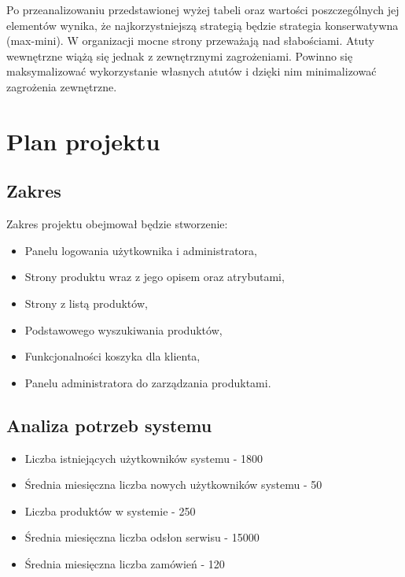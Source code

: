 \documentclass[12pt,a4paper,titlepage]{article}
\begin{document}
Po przeanalizowaniu przedstawionej wyżej tabeli oraz wartości poszczególnych jej elementów wynika, że najkorzystniejszą strategią będzie strategia konserwatywna (max-mini). W organizacji mocne strony przeważają nad słabościami. Atuty wewnętrzne wiążą się jednak z zewnętrznymi zagrożeniami. Powinno się maksymalizować wykorzystanie własnych atutów i dzięki nim minimalizować zagrożenia zewnętrzne.

\newpage
\section{Plan projektu}

\subsection{Zakres}
Zakres projektu obejmował będzie stworzenie:
\begin{itemize}
    \item Panelu logowania użytkownika i administratora,
    \item Strony produktu wraz z jego opisem oraz atrybutami,
    \item Strony z listą produktów,
    \item Podstawowego wyszukiwania produktów,
    \item Funkcjonalności koszyka dla klienta,
    \item Panelu administratora do zarządzania produktami.
\end{itemize}

\subsection{Analiza potrzeb systemu}
\begin{itemize}
    \item Liczba istniejących użytkowników systemu - 1800
    \item Średnia miesięczna liczba nowych użytkowników systemu - 50
    \item Liczba produktów w systemie - 250
    \item Średnia miesięczna liczba odsłon serwisu - 15000
    \item Średnia miesięczna liczba zamówień - 120
\end{itemize}
\end{document}

